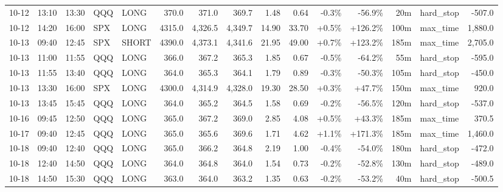 \documentclass[11pt,a4paper,twoside]{article}
\begin{document}
\begin{landscape}
\begin{center}
\begin{longtable}{>{\color{txtmain}}l l l l l r r r r r r r r >{\color{txtmain}}l r}
10-12 & 13:10 & 13:30 & QQQ & LONG & 370.0 & 371.0 & 369.7 & 1.48 & 0.64 & \textcolor{lossred}{-0.3\%} & \textcolor{lossred}{-56.9\%} & 20m & hard\_stop & \textcolor{lossred}{-507.0} \\
10-12 & 14:20 & 16:00 & SPX & LONG & 4315.0 & 4,326.5 & 4,349.7 & 14.90 & 33.70 & \textcolor{wingreen}{+0.5\%} & \textcolor{wingreen}{+126.2\%} & 100m & max\_time & \textcolor{wingreen}{1,880.0} \\
10-13 & 09:40 & 12:45 & SPX & SHORT & 4390.0 & 4,373.1 & 4,341.6 & 21.95 & 49.00 & \textcolor{wingreen}{+0.7\%} & \textcolor{wingreen}{+123.2\%} & 185m & max\_time & \textcolor{wingreen}{2,705.0} \\
10-13 & 11:00 & 11:55 & QQQ & LONG & 366.0 & 367.2 & 365.3 & 1.85 & 0.67 & \textcolor{lossred}{-0.5\%} & \textcolor{lossred}{-64.2\%} & 55m & hard\_stop & \textcolor{lossred}{-595.0} \\
10-13 & 11:55 & 13:40 & QQQ & LONG & 364.0 & 365.3 & 364.1 & 1.79 & 0.89 & \textcolor{lossred}{-0.3\%} & \textcolor{lossred}{-50.3\%} & 105m & hard\_stop & \textcolor{lossred}{-450.0} \\
10-13 & 13:30 & 16:00 & SPX & LONG & 4300.0 & 4,314.9 & 4,328.0 & 19.30 & 28.50 & \textcolor{wingreen}{+0.3\%} & \textcolor{wingreen}{+47.7\%} & 150m & max\_time & \textcolor{wingreen}{920.0} \\
10-13 & 13:45 & 15:45 & QQQ & LONG & 364.0 & 365.2 & 364.5 & 1.58 & 0.69 & \textcolor{lossred}{-0.2\%} & \textcolor{lossred}{-56.5\%} & 120m & hard\_stop & \textcolor{lossred}{-537.0} \\
10-16 & 09:45 & 12:50 & QQQ & LONG & 365.0 & 367.2 & 369.0 & 2.85 & 4.08 & \textcolor{wingreen}{+0.5\%} & \textcolor{wingreen}{+43.3\%} & 185m & max\_time & \textcolor{wingreen}{370.5} \\
10-17 & 09:40 & 12:45 & QQQ & LONG & 365.0 & 365.6 & 369.6 & 1.71 & 4.62 & \textcolor{wingreen}{+1.1\%} & \textcolor{wingreen}{+171.3\%} & 185m & max\_time & \textcolor{wingreen}{1,460.0} \\
10-18 & 09:40 & 12:40 & QQQ & LONG & 365.0 & 366.2 & 364.8 & 2.19 & 1.00 & \textcolor{lossred}{-0.4\%} & \textcolor{lossred}{-54.0\%} & 180m & hard\_stop & \textcolor{lossred}{-472.0} \\
10-18 & 12:40 & 14:50 & QQQ & LONG & 364.0 & 364.8 & 364.0 & 1.54 & 0.73 & \textcolor{lossred}{-0.2\%} & \textcolor{lossred}{-52.8\%} & 130m & hard\_stop & \textcolor{lossred}{-489.0} \\
10-18 & 14:50 & 15:30 & QQQ & LONG & 363.0 & 364.0 & 363.2 & 1.35 & 0.63 & \textcolor{lossred}{-0.2\%} & \textcolor{lossred}{-53.2\%} & 40m & hard\_stop & \textcolor{lossred}{-500.5} \\

\end{longtable}
\end{center}
\end{landscape}
\end{document}
